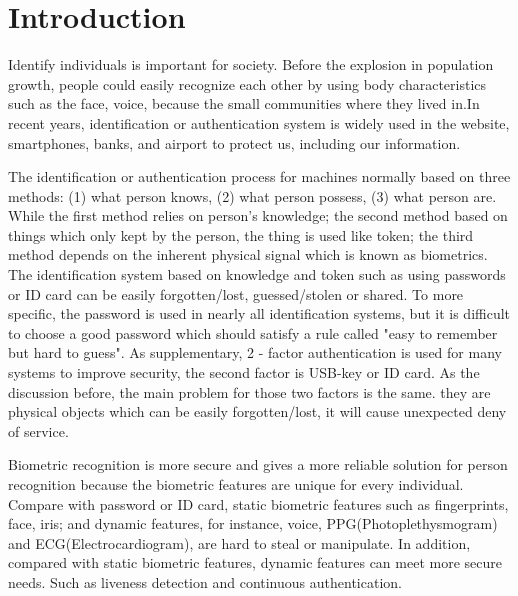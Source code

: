\documentclass[a4paper,12pt]{article}
\begin{document}

\clearpage
\tableofcontents\label{c}

\clearpage
\section{Introduction}\label{Introduction}
Identify individuals is important for society. Before the explosion in population growth, people could easily recognize each other by using body characteristics such as the face, voice, because the small communities where they lived in\parencite{Jain:2011bio}.In recent years, identification or authentication system is widely used in the website, smartphones, banks, and airport to protect us, including our information\parencite{Pinto:2018evolution}. 

The identification or authentication process for machines normally based on three methods: (1) what person knows, (2) what person possess, (3) what person are. While the first method relies on person's knowledge; the second method based on things which only kept by the person, the thing is used like token; the third method depends on the inherent physical signal which is known as biometrics. The identification system based on knowledge and token such as using passwords or ID card can be easily forgotten/lost, guessed/stolen or shared\parencite{Jain:2011bio}. To more specific, the password is used in nearly all identification systems, but it is difficult to choose a good password which should satisfy a rule called "easy to remember but hard to guess". As supplementary, 2 - factor authentication is used for many systems to improve security, the second factor is USB-key or ID card. As the discussion before, the main problem for those two factors is the same. they are physical objects which can be easily forgotten/lost, it will cause unexpected deny of service\parencite{Blasco:2018feasibility}.

Biometric recognition is more secure and gives a more reliable solution for person recognition because the biometric features are unique for every individual\parencite{Jain:2011bio}. Compare with password or ID card, static biometric features such as fingerprints, face, iris; and dynamic features, for instance, voice, PPG(Photoplethysmogram) and ECG(Electrocardiogram), are hard to steal or manipulate\parencite{Agrafioti:2011heart}. In addition, compared with static biometric features, dynamic features can meet more secure needs. Such as liveness detection and continuous authentication\parencite{Agrafioti:2011medical}.
\end{document}
